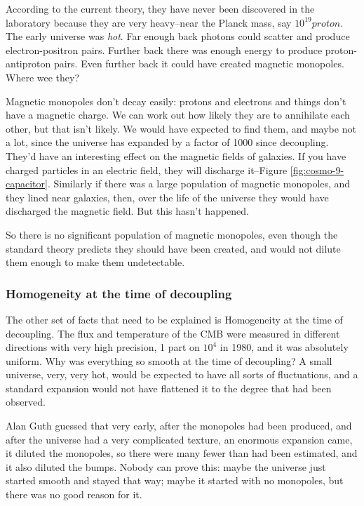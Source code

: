 \documentclass[]{article}
\begin{document}
According to the current theory, they have never been discovered in the laboratory because they are very heavy--near the Planck mass, say $10^{19}proton$. The early universe was \emph{hot}. Far enough back photons could scatter and produce electron-positron pairs. Further back there was enough energy to produce proton-antiproton pairs. Even further back it could have created magnetic monopoles. Where wee they?

Magnetic monopoles  don't decay easily: protons and electrons and things don't have a magnetic charge. We can work out how likely they are to annihilate each other, but that isn't likely. We would have expected to find them, and maybe not a lot, since the universe has expanded by a factor of 1000 since decoupling. They'd have an interesting effect on the magnetic fields of galaxies. If you have charged particles in an electric field, they will discharge it--Figure \ref{fig:cosmo-9-capacitor}. Similarly if there was a large population of magnetic monopoles, and they lined near galaxies, then, over the life of the universe they would have discharged the magnetic field. But this hasn't happened.

So there is no significant population of magnetic monopoles, even though the standard theory predicts they should have been created, and would not dilute them enough to make them undetectable.

\subsubsection{Homogeneity at the time of decoupling}

The other set of facts that need to be explained is Homogeneity at the time of decoupling. The flux and temperature of the  CMB were measured in different directions with very high precision, 1 part on $10^4$ in 1980, and it was absolutely uniform. Why was everything so smooth at the time of decoupling? A small universe, very, very hot, would be expected to have all sorts of fluctuations, and a standard expansion would not have flattened it to the degree that had been observed.

 Alan Guth guessed that very early, after the monopoles had been produced, and after the universe had a very complicated texture, an enormous expansion came, it diluted the monopoles, so there were many fewer than had been estimated, and it also diluted the bumps. Nobody can prove this: maybe the universe just started smooth and stayed that way; maybe it started with no monopoles, but there was no good reason for it.
 
\end{document}
